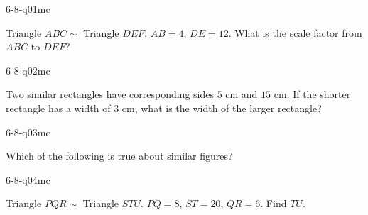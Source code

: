 

\begin{practiceQuestion}{6-8-q01}{mc}
\begin{questionText}
Triangle $ABC \sim$ Triangle $DEF$. $AB = 4$, $DE = 12$. What is the scale factor from $ABC$ to $DEF$?
\end{questionText}
\end{practiceQuestion}

\begin{practiceQuestion}{6-8-q02}{mc}
\begin{questionText}
Two similar rectangles have corresponding sides $5$ cm and $15$ cm. If the shorter rectangle has a width of $3$ cm, what is the width of the larger rectangle?
\end{questionText}
\end{practiceQuestion}

\begin{practiceQuestion}{6-8-q03}{mc}
\begin{questionText}
Which of the following is true about similar figures?
\end{questionText}
\end{practiceQuestion}

\begin{practiceQuestion}{6-8-q04}{mc}
\begin{questionText}
Triangle $PQR \sim$ Triangle $STU$. $PQ = 8$, $ST = 20$, $QR = 6$. Find $TU$.
\end{questionText}
\end{practiceQuestion}


